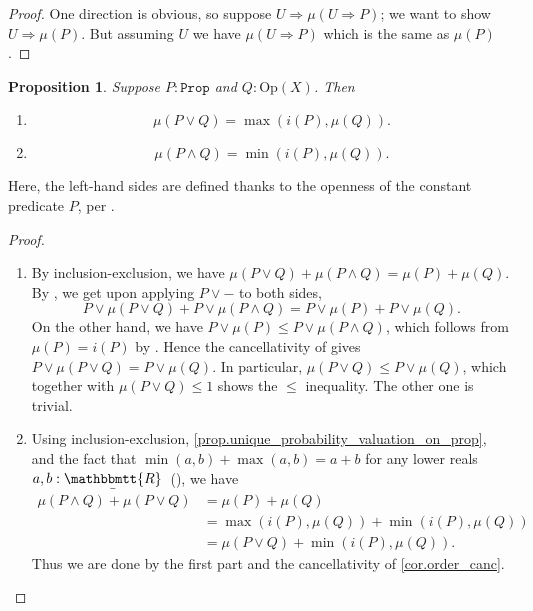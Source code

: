 \documentclass[11pt, oneside, article]{memoir}
\theoremstyle{plain}
\newtheorem{proposition}[theorem]{Proposition}
\theoremstyle{definition}
\theoremstyle{remark}
\newcommand{\const}[1]{\mathtt{#1}}
\newcommand{\Set}[1]{\mathrm{#1}}
\newcommand{\ubar}[1]{\underaccent{\bar}{#1}}
\newcommand{\internal}[1]{\raisebox{-.03ex}{$\mathbbmtt{#1}$}}
\newcommand{\hs}{\hspace{1.1pt}}
\newcommand{\tRR}{\internal{R}\hs}
\newcommand{\tLR}{\ubar{\tRR}\hs}
\newcommand{\Prop}{\const{Prop}}
\newcommand{\Op}{\Set{Op}}
\newcommand{\imp}{\Rightarrow}
\begin{document}
\begin{proof}
	One direction is obvious, so suppose $U\imp\mu(U\imp P)$; we want to show $U\imp\mu(P)$. But assuming $U$ we have $\mu(U\imp P)$ which is the same as $\mu(P)$.
\end{proof}

\begin{proposition}\label{prop.valuations_OR}
	Suppose $P:\Prop$ and $Q:\Op(X)$. Then
	\begin{enumerate}
		\item \[\mu(P\vee Q)= \max(i(P),\mu(Q)). \]
		\item \[\mu(P\wedge Q) = \min(i(P),\mu(Q)).\]
	\end{enumerate}
\end{proposition} 

Here, the left-hand sides are defined thanks to the openness of the constant predicate $P$, per .

\begin{proof}
	\begin{enumerate}
	\item By inclusion-exclusion, we have $\mu(P\vee Q)+\mu(P\wedge Q)=\mu(P)+\mu(Q)$. By , we get upon applying $P \lor -$ to both sides,
		\[
			P \lor \mu(P \vee Q) + P \lor \mu (P\wedge Q) = P \lor \mu(P) + P \lor \mu(Q).
		\]
		On the other hand, we have $P \lor \mu(P) \leq P \lor \mu(P \land Q)$, which follows from $\mu(P) = i(P)$ by . Hence the cancellativity of  gives $P \lor \mu(P \vee Q) = P \lor \mu(Q)$. In particular, $\mu(P \vee Q) \leq P \lor \mu(Q)$, which together with $\mu(P \vee Q) \leq 1$ shows the $\leq$ inequality. The other one is trivial.
	
	\item Using inclusion-exclusion, \cref{prop.unique_probability_valuation_on_prop}, and the fact that $\min(a,b)+\max(a,b)=a+b$ for any lower reals $a,b:\tLR$ (), we have
\begin{align*}
	\mu(P\wedge Q)+\mu(P\vee Q) & =\mu(P)+\mu(Q) \\
	&=\max(i(P),\mu(Q))+\min(i(P),\mu(Q))\\
	&=\mu(P\vee Q)+\min(i(P),\mu(Q)).
\end{align*}
Thus we are done by the first part and the cancellativity of \cref{cor.order_canc}. \qedhere
\end{enumerate}
\end{proof}
\end{document}

